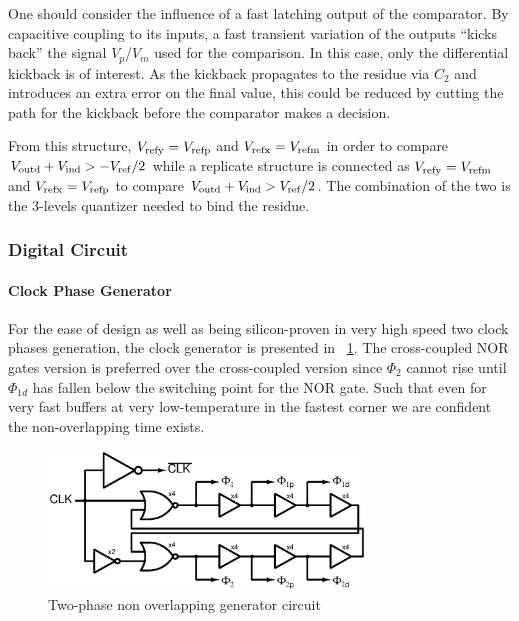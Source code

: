 One should consider the influence of a fast latching output of the comparator. By capacitive coupling to its inputs, a fast transient variation of the outputs ``kicks back'' the signal \(V_p\)/\(V_m\) used for the comparison. In this case, only the differential kickback is of interest. As the kickback propagates to the residue via \(C_2\) and introduces an extra error on the final value, this could be reduced by cutting the path for the kickback before the comparator makes a decision.

From this structure, \(V_{\rm refy} = V_{\rm refp}\) and \(V_{\rm refx} = V_{\rm refm}\) in order to compare \(V_{\rm outd}+V_{\rm ind} > - V_{\rm ref}/2\) while a replicate structure is connected as \(V_{\rm refy} = V_{\rm refm}\) and \(V_{\rm refx} = V_{\rm refp}\) to compare \(V_{\rm outd}+V_{\rm ind} > V_{\rm ref}/2\). The combination of the two is the 3-levels quantizer needed to bind the residue.

	\subsubsection{Digital Circuit}         %
\paragraph{Clock Phase Generator}   %

For the ease of design as well as being silicon-proven in very high speed two clock phases generation, the clock generator is presented in \figurename~\ref{fig:non-ov}. The cross-coupled NOR gates version is preferred over the cross-coupled version since \(\Phi_2 \) cannot rise until \(\Phi_{1d} \) has fallen below
the switching point for the NOR gate. Such that even for very fast buffers at very low-temperature in the fastest corner we are confident the non-overlapping time exists. 
	
\begin{figure}[htp]
	\centering
	\includegraphics[width=0.75\textwidth]{Chapter4/Figs/non-overlapp.ps}
	\caption{Two-phase non overlapping generator circuit}
	\label{fig:non-ov}
\end{figure}


